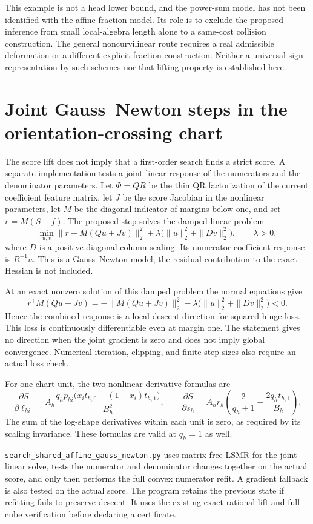 \documentclass[11pt]{article}
\begin{document}
This example is not a head lower bound, and the power-sum model has
not been identified with the affine-fraction model. Its role is to
exclude the proposed inference from small local-algebra length alone
to a same-cost collision construction. The general noncurvilinear
route requires a real admissible deformation or a different explicit
fraction construction. Neither a universal sign representation by
such schemes nor that lifting property is established here.

\section{Joint Gauss--Newton steps in the orientation-crossing chart}

The score lift does not imply that a first-order search finds a strict
score. A separate implementation tests a joint linear response of the
numerators and the denominator parameters. Let $\Phi=QR$ be the thin
QR factorization of the current coefficient feature matrix, let $J$ be
the score Jacobian in the nonlinear parameters, let $M$ be the diagonal
indicator of margins below one, and set $r=M(S-f)$. The proposed step
solves the damped linear problem
\[
 \min_{u,v}\|r+M(Qu+Jv)\|_2^2
       +\lambda\bigl(\|u\|_2^2+\|Dv\|_2^2\bigr),
 \qquad \lambda>0,
\]
where $D$ is a positive diagonal column scaling. Its numerator
coefficient response is $R^{-1}u$. This is a Gauss--Newton model;
the residual contribution to the exact Hessian is not included.

At an exact nonzero solution of this damped problem the normal equations
give
\[
 r^{\mathsf T}M(Qu+Jv)
 =-\|M(Qu+Jv)\|_2^2
  -\lambda\bigl(\|u\|_2^2+\|Dv\|_2^2\bigr)<0.
\]
Hence the combined response is a local descent direction for squared
hinge loss. This loss is continuously differentiable even at margin one.
The statement gives no direction when the joint gradient is zero and
does not imply global convergence. Numerical iteration, clipping, and
finite step sizes also require an actual loss check.

For one chart unit, the two nonlinear derivative formulas are
\[
 \frac{\partial S}{\partial\ell_{hi}}
 =A_h\frac{q_hp_{hi}\bigl(x_it_{h,0}-(1-x_i)t_{h,1}\bigr)}{B_h^2},
 \qquad
 \frac{\partial S}{\partial s_h}
 =A_hr_h\left(\frac2{q_h+1}-\frac{2q_ht_{h,1}}{B_h}\right).
\]
The sum of the log-shape derivatives within each unit is zero, as
required by its scaling invariance. These formulas are valid at
$q_h=1$ as well.

\texttt{search\_shared\_affine\_gauss\_newton.py} uses matrix-free
LSMR for the joint linear solve, tests the numerator and denominator
changes together on the actual score, and only then performs the full
convex numerator refit. A gradient fallback is also tested on the
actual score. The program retains the previous state if refitting
fails to preserve descent. It uses the existing exact rational lift
and full-cube verification before declaring a certificate.
\end{document}
